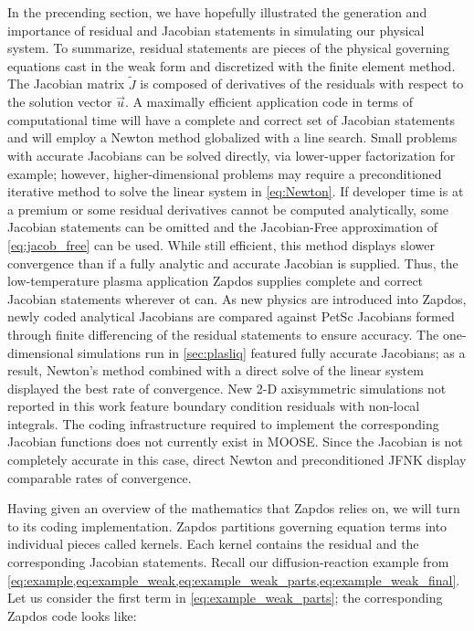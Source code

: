 In the precending section, we have hopefully illustrated the generation and importance of residual and Jacobian statements in simulating our physical system. To summarize, residual statements are pieces of the physical governing equations cast in the weak form and discretized with the finite element method. The Jacobian matrix $\tilde{J}$ is composed of derivatives of the residuals with respect to the solution vector $\vec{u}$. A maximally efficient application code in terms of computational time will have a complete and correct set of Jacobian statements and will employ a Newton method globalized with a line search. Small problems with accurate Jacobians can be solved directly, via lower-upper factorization for example; however, higher-dimensional problems may require a preconditioned iterative method to solve the linear system in \cref{eq:Newton}. If developer time is at a premium or some residual derivatives cannot be computed analytically, some Jacobian statements can be omitted and the Jacobian-Free approximation of \cref{eq:jacob_free} can be used. While still efficient, this method displays slower convergence than if a fully analytic and accurate Jacobian is supplied. Thus, the low-temperature plasma application Zapdos supplies complete and correct Jacobian statements wherever ot can. As new physics are introduced into Zapdos, newly coded analytical Jacobians are compared against PetSc Jacobians formed through finite differencing of the residual statements to ensure accuracy. The one-dimensional simulations run in \cref{sec:plasliq} featured fully accurate Jacobians; as a result, Newton's method combined with a direct solve of the linear system displayed the best rate of convergence. New 2-D axisymmetric simulations not reported in this work feature boundary condition residuals with non-local integrals. The coding infrastructure required to implement the corresponding Jacobian functions does not currently exist in MOOSE. Since the Jacobian is not completely accurate in this case, direct Newton and preconditioned JFNK display comparable rates of convergence.

Having given an overview of the mathematics that Zapdos relies on, we will turn to its coding implementation. Zapdos partitions governing equation terms into individual pieces called kernels. Each kernel contains the residual and the corresponding Jacobian statements. Recall our diffusion-reaction example from \cref{eq:example,eq:example_weak,eq:example_weak_parts,eq:example_weak_final}. Let us consider the first term in \cref{eq:example_weak_parts}; the corresponding Zapdos code looks like:

